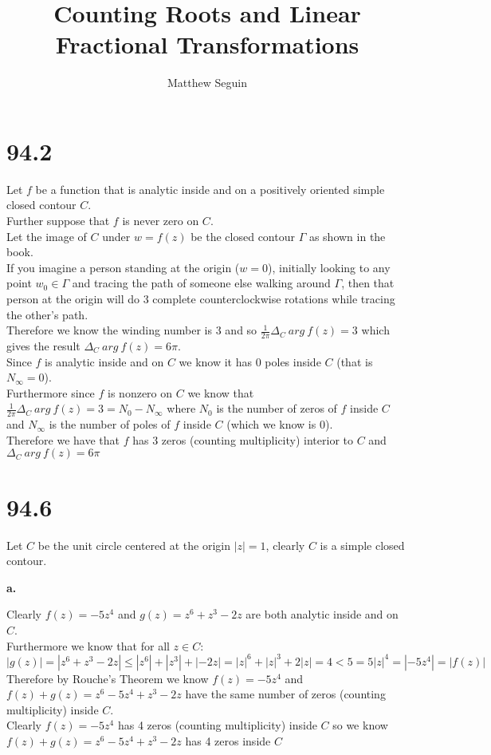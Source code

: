 \documentclass{article}
\title{Counting Roots and Linear Fractional Transformations}
\author{Matthew Seguin}
\date{}
\begin{document}
\maketitle

\section*{94.2}
\begin{center}
    \doublespacing
    Let $f$ be a function that is analytic inside and on a positively oriented simple closed contour $C$.
    \\Further suppose that $f$ is never zero on $C$.
    \\Let the image of $C$ under $w = f(z)$ be the closed contour $\Gamma$ as shown in the book.
    \\If you imagine a person standing at the origin ($w = 0$), initially looking to any point $w_0\in\Gamma$ and tracing the path of someone else walking around $\Gamma$, then that person at the origin will do 3 complete counterclockwise rotations while tracing the other's path.
    \\Therefore we know the winding number is 3 and so $\frac{1}{2\pi}\Delta _C\:arg\:f(z) = 3$ which gives the result $\Delta _C\:arg\:f(z) = 6\pi$.
    \\Since $f$ is analytic inside and on $C$ we know it has 0 poles inside $C$ (that is $N_{\infty} = 0$).
    \\Furthermore since $f$ is nonzero on $C$ we know that $\frac{1}{2\pi}\Delta _C\:arg\:f(z) = 3 = N_0 - N_{\infty}$ where $N_0$ is the number of zeros of $f$ inside $C$ and $N_{\infty}$ is the number of poles of $f$ inside $C$ (which we know is 0).
    \\Therefore we have that $f$ has 3 zeros (counting multiplicity) interior to $C$ and $\Delta _C\:arg\:f(z) = 6\pi$ \qedsymbol
    \break
\end{center}


\newpage
\section*{94.6}
\begin{center}
    Let $C$ be the unit circle centered at the origin $|z| = 1$, clearly $C$ is a simple closed contour.
\end{center}

{\Large\textbf{a.}}
\begin{center}
    \doublespacing
    Clearly $f(z) = -5z^4$ and $g(z) = z^6 + z^3 - 2z$ are both analytic inside and on $C$.
    \\Furthermore we know that for all $z\in C$:
    \\$|g(z)| = |z^6 + z^3 - 2z|\leq |z^6| + |z^3| + |-2z| = |z|^6 + |z|^3 + 2|z| = 4 < 5 = 5|z|^4 = |-5z^4| =  |f(z)|$
    \\Therefore by Rouche's Theorem we know $f(z) = -5z^4$ and $f(z) + g(z) = z^6 - 5z^4 + z^3 - 2z$ have the same number of zeros (counting multiplicity) inside $C$.
    \\Clearly $f(z) = -5z^4$ has 4 zeros (counting multiplicity) inside $C$ so we know $f(z) + g(z) = z^6 - 5z^4 + z^3 - 2z$ has 4 zeros inside $C$ \qedsymbol
\end{center}
\end{document}
